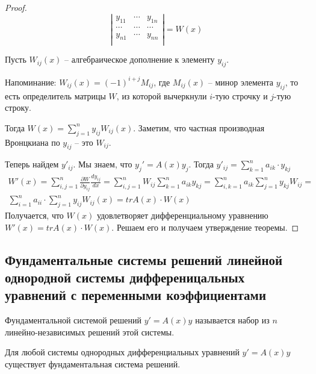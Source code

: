 \documentclass[document.tex]{subfiles}
\begin{document}
\begin{proof}
    \[
        \left|
            \begin{matrix}
                y_{11} & \cdots & y_{1n} \\
                \cdots & \cdots & \cdots \\
                y_{n1} & \cdots & y_{nn} \\
            \end{matrix}
        \right| = W(x)
    \]

    Пусть $W_{ij}(x)$ -- алгебраическое дополнение к элементу $y_{ij}$.

    Напоминание: $W_{ij}(x) = (-1)^{i + j} M_{ij}$, где
    $M_{ij}(x)$ -- минор элемента $y_{ij}$, то есть определитель матрицы $W$, из которой вычеркнули $i$-тую строчку и
    $j$-тую строку.

    Тогда $W(x) = \sum_{j = 1}^n y_{ij}W_{ij}(x)$. Заметим, что частная производная Вронцкиана по $y_{ij}$ -- это
    $W_{ij}$.

    Теперь найдем $y'_{ij}$. Мы знаем, что $y_j' = A(x)y_j$. Тогда $y'_{ij} = \sum_{k = 1}^n a_{ik} \cdot
    y_{kj}$
    \begin{multline*}
        W'(x) = \sum_{i, j = 1}^n \frac{\partial W}{\partial y_{ij}} \frac{d y_{ij}}{dx} = \sum_{i, j = 1}^n
        W_{ij} \sum_{k = 1}^n a_{ik}y_{kj} = \sum_{i, k = 1}^n a_{ik} \sum_{j = 1}^n y_{kj} W_{ij} = \\
        \sum_{i = 1}^n a_{ii} \cdot \sum_{j = 1}^n y_{ij} W_{ij}(x) = tr A(x) \cdot W(x)
    \end{multline*}
    Получается, что $W(x)$ удовлетворяет дифференциальному уравнению $W'(x) = tr A(x) \cdot W(x)$. Решаем его и
    получаем утверждение теоремы.

\end{proof}

\subsection{Фундаментальные системы решений линейной однородной системы дифференицальных уравнений с переменными
    коэффициентами}

\begin{definition}
    Фундаментальной системой решений $y' = A(x)y$ называется набор из $n$ линейно-независимых решений этой системы.
\end{definition}

\begin{theorem}
    Для любой системы однородных дифференциальных уравнений $y' = A(x)y$ существует фундаментальная система решений.
\end{theorem}
\end{document}
